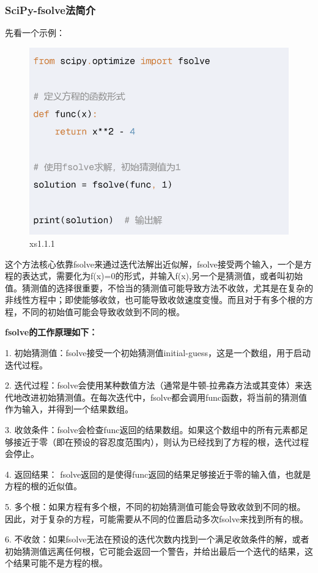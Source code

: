 \documentclass[12pt]{article}
\begin{document}
\subsubsection{SciPy-fsolve法简介}
先看一个示例：
\begin{figure}[H]
    \centering
    \includegraphics[width=0.75\linewidth]{解方程 program1.png}
    \caption{xs1.1.1}
    \label{fig:enter-label}
\end{figure}
这个方法核心依靠fsolve来通过迭代法解出近似解，fsolve接受两个输入，一个是方程的表达式，需要化为f(x)=0的形式，并输入f(x),另一个是猜测值，或者叫初始值。猜测值的选择很重要，不恰当的猜测值可能导致方法不收敛，尤其是在复杂的非线性方程中；即使能够收敛，也可能导致收敛速度变慢。而且对于有多个根的方程，不同的初始值可能会导致收敛到不同的根。

\noindent \textbf{fsolve的工作原理如下：}

 1. 初始猜测值：fsolve接受一个初始猜测值initial-guess，这是一个数组，用于启动迭代过程。
 
 2. 迭代过程：fsolve会使用某种数值方法（通常是牛顿-拉弗森方法或其变体）来迭代地改进初始猜测值。在每次迭代中，fsolve都会调用func函数，将当前的猜测值作为输入，并得到一个结果数组。
 
 3. 收敛条件：fsolve会检查func返回的结果数组。如果这个数组中的所有元素都足够接近于零（即在预设的容忍度范围内），则认为已经找到了方程的根，迭代过程会停止。
 
 4. 返回结果：  fsolve返回的是使得func返回的结果足够接近于零的输入值，也就是方程的根的近似值。
 
 5. 多个根：如果方程有多个根，不同的初始猜测值可能会导致收敛到不同的根。因此，对于复杂的方程，可能需要从不同的位置启动多次fsolve来找到所有的根。
 
 6. 不收敛：如果fsolve无法在预设的迭代次数内找到一个满足收敛条件的解，或者初始猜测值远离任何根，它可能会返回一个警告，并给出最后一个迭代的结果，这个结果可能不是方程的根。
\end{document}

